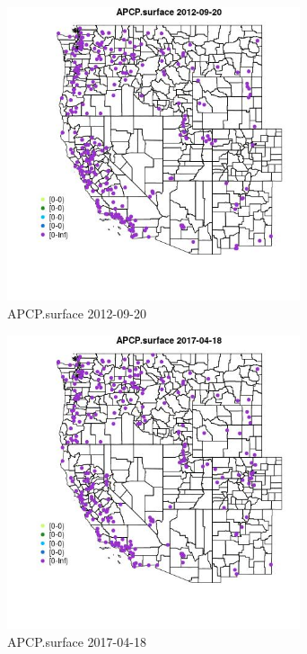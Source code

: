 \begin{figure} 
\centering  
\includegraphics[width=0.77\textwidth]{Code_Outputs/Report_ML_input_PM25_Step4_part_e_de_duplicated_aves_compiled_2019-05-14wNAs_MapObsAPCPsurface2012-09-20.jpg} 
\caption{\label{fig:Report_ML_input_PM25_Step4_part_e_de_duplicated_aves_compiled_2019-05-14wNAsMapObsAPCPsurface2012-09-20}APCP.surface 2012-09-20} 
\end{figure} 
 

\begin{figure} 
\centering  
\includegraphics[width=0.77\textwidth]{Code_Outputs/Report_ML_input_PM25_Step4_part_e_de_duplicated_aves_compiled_2019-05-14wNAs_MapObsAPCPsurface2017-04-18.jpg} 
\caption{\label{fig:Report_ML_input_PM25_Step4_part_e_de_duplicated_aves_compiled_2019-05-14wNAsMapObsAPCPsurface2017-04-18}APCP.surface 2017-04-18} 
\end{figure} 
 

